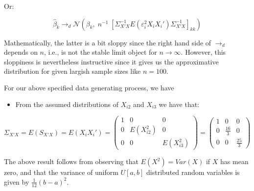 \documentclass[
  letterpaper,
  DIV=11,
  numbers=noendperiod]{scrreprt}
\providecommand{\tightlist}{%
  \setlength{\itemsep}{0pt}\setlength{\parskip}{0pt}}\usepackage{longtable,booktabs,array}
\theoremstyle{definition}
\theoremstyle{plain}
\theoremstyle{plain}
\theoremstyle{remark}
\begin{document}
{Or:

\[
\hat\beta_k\to_d\mathcal{N}\left(\beta_k, \;n^{-1}\;\left[\Sigma_{X'X}^{-1}E(\varepsilon^2_iX_iX_i')\Sigma_{X'X}^{-1}\right]_{kk}\right)
\]

Mathematically, the latter is a bit sloppy since the right hand side of
\(\to_d\) depends on \(n\), i.e., is not the stable limit object for
\(n\to\infty\). However, this sloppiness is nevertheless instructive
since it gives us the approximative distribution for given largish
sample sizes like \(n=100\).

For our above specified data generating process, we have

\begin{itemize}
\tightlist
\item
  From the assumed distributions of \(X_{i2}\) and \(X_{i3}\) we have
  that:
\end{itemize}

\[
\Sigma_{X'X}=E(S_{X'X})=E(X_iX_i')
=\left(\begin{matrix}1&0&0\\0&E(X_{i2}^2)&0\\0&0&E(X_{i3}^2)\end{matrix}\right)
=\left(\begin{matrix}1&0&0\\0&\frac{16}{3}&0\\0&0&\frac{25}{3}\end{matrix}\right)
\]

The above result follows from observing that \(E(X^2)=Var(X)\) if \(X\)
has mean zero, and that the variance of uniform \(U[a,b]\) distributed
random variables is given by \(\frac{1}{12}(b-a)^2\).

}
\end{document}
